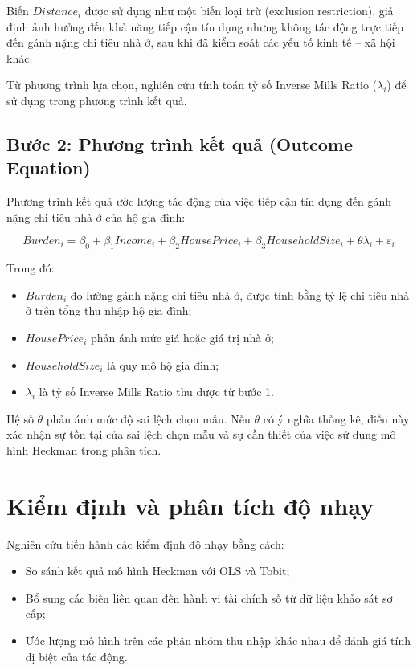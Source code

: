 \documentclass[12pt,a4paper]{report}
\begin{document}
	Biến $Distance_i$ được sử dụng như một biến loại trừ (exclusion restriction), giả định ảnh hưởng đến khả năng tiếp cận tín dụng nhưng không tác động trực tiếp đến gánh nặng chi tiêu nhà ở, sau khi đã kiểm soát các yếu tố kinh tế – xã hội khác.
	
	Từ phương trình lựa chọn, nghiên cứu tính toán tỷ số Inverse Mills Ratio ($\lambda_i$) để sử dụng trong phương trình kết quả.
	
	\subsection{Bước 2: Phương trình kết quả (Outcome Equation)}
	
	Phương trình kết quả ước lượng tác động của việc tiếp cận tín dụng đến gánh nặng chi tiêu nhà ở của hộ gia đình:
	
	\begin{equation}
		Burden_i = \beta_0 + \beta_1 Income_i + \beta_2 HousePrice_i + \beta_3 HouseholdSize_i + \theta \lambda_i + \varepsilon_i
	\end{equation}
	
	Trong đó:
	\begin{itemize}
		\item $Burden_i$ đo lường gánh nặng chi tiêu nhà ở, được tính bằng tỷ lệ chi tiêu nhà ở trên tổng thu nhập hộ gia đình;
		\item $HousePrice_i$ phản ánh mức giá hoặc giá trị nhà ở;
		\item $HouseholdSize_i$ là quy mô hộ gia đình;
		\item $\lambda_i$ là tỷ số Inverse Mills Ratio thu được từ bước 1.
	\end{itemize}
	
	Hệ số $\theta$ phản ánh mức độ sai lệch chọn mẫu. Nếu $\theta$ có ý nghĩa thống kê, điều này xác nhận sự tồn tại của sai lệch chọn mẫu và sự cần thiết của việc sử dụng mô hình Heckman trong phân tích.
	
	\section{Kiểm định và phân tích độ nhạy}
	
	Nghiên cứu tiến hành các kiểm định độ nhạy bằng cách:
	\begin{itemize}
		\item So sánh kết quả mô hình Heckman với OLS và Tobit;
		\item Bổ sung các biến liên quan đến hành vi tài chính số từ dữ liệu khảo sát sơ cấp;
		\item Ước lượng mô hình trên các phân nhóm thu nhập khác nhau để đánh giá tính dị biệt của tác động.
	\end{itemize}
	
\end{document}
